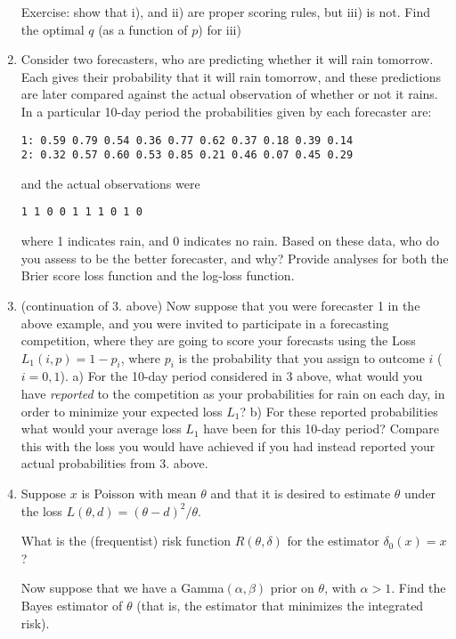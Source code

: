 \documentclass[12pt]{article}
\def\t{\theta}
\begin{document}
\begin{enumerate}
Exercise: show that i), and ii) are proper scoring rules, but iii) is not. Find the optimal $q$ (as a function of $p$) for iii)


\item Consider two forecasters, who are predicting whether it will rain tomorrow. Each gives their probability that it will rain tomorrow, and these predictions are later compared against the actual observation of whether or not it rains. In a particular 10-day period the probabilities given by each forecaster are: 
\begin{verbatim}
1: 0.59 0.79 0.54 0.36 0.77 0.62 0.37 0.18 0.39 0.14
2: 0.32 0.57 0.60 0.53 0.85 0.21 0.46 0.07 0.45 0.29
\end{verbatim}
and the actual observations were
\begin{verbatim}
1 1 0 0 1 1 1 0 1 0
\end{verbatim}
where 1 indicates rain, and 0 indicates no rain.
Based on these data, who do you assess to be the better forecaster, and why? Provide analyses for both the Brier score loss function and the log-loss function.

\item (continuation of 3. above) Now suppose that you were forecaster 1 in the above example, and you were invited to participate in a forecasting competition, where they are going to score your forecasts using the Loss
$L_1(i,p) = 1-p_i$, where $p_i$ is the probability that you assign to outcome $i$ ($i=0,1$). a) For the 10-day period considered in 3 above, what would you have {\it reported} to the competition as your probabilities for rain on each day, in order to minimize your expected loss $L_1$? b) For these reported probabilities what would your average loss $L_1$ have been for this 10-day period? Compare this with the loss you would have achieved if you had instead reported your actual probabilities from 3. above. 


\item Suppose $x$ is Poisson with mean $\t$ and that it is desired to estimate $\t$ under the loss $L(\t,d) = (\t - d)^2/\t$.  

What is the (frequentist) risk function $R(\t, \delta)$ for the estimator $\delta_0(x)=x$?

Now suppose that we have a Gamma$(\alpha, \beta)$ prior on $\t$, with $\alpha>1$.  Find the Bayes estimator of $\t$  (that is, the estimator
that minimizes the integrated risk).


\end{enumerate}
\end{document}
